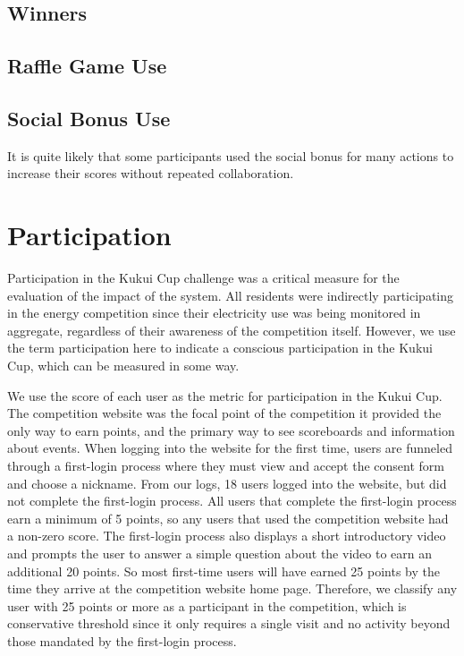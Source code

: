 
\subsection{Winners}






\subsection{Raffle Game Use}


\subsection{Social Bonus Use}

It is quite likely that some participants used the social bonus for many actions to increase their scores without repeated collaboration. 


\section{Participation}
\label{sec:participation}

Participation in the Kukui Cup challenge was a critical measure for the evaluation of the impact of the system. All residents were indirectly participating in the energy competition since their electricity use was being monitored in aggregate, regardless of their awareness of the competition itself. However, we use the term participation here to indicate a conscious participation in the Kukui Cup, which can be measured in some way.

We use the score of each user as the metric for participation in the Kukui Cup. The competition website was the focal point of the competition it provided the only way to earn points, and the primary way to see scoreboards and information about events. When logging into the website for the first time, users are funneled through a first-login process where they must view and accept the consent form and choose a nickname. From our logs, 18 users logged into the website, but did not complete the first-login process. All users that complete the first-login process earn a minimum of 5 points, so any users that used the competition website had a non-zero score. The first-login process also displays a short introductory video and prompts the user to answer a simple question about the video to earn an additional 20 points. So most first-time users will have earned 25 points by the time they arrive at the competition website home page. Therefore, we classify any user with 25 points or more as a participant in the competition, which is conservative threshold since it only requires a single visit and no activity beyond those mandated by the first-login process.

